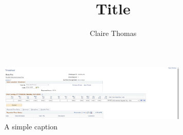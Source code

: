 \documentclass[11 pt]{article}
\author{Claire Thomas }
\title{Title}
\begin{document}
\maketitle
\newpage 

\begin{figure}[ht!]
    \centering
    \includegraphics[width=90mm]{Screenshot 2022-08-11 131033.png}
    \caption{A simple caption \label{overflow}}
    \end{figure}
\end{document}
